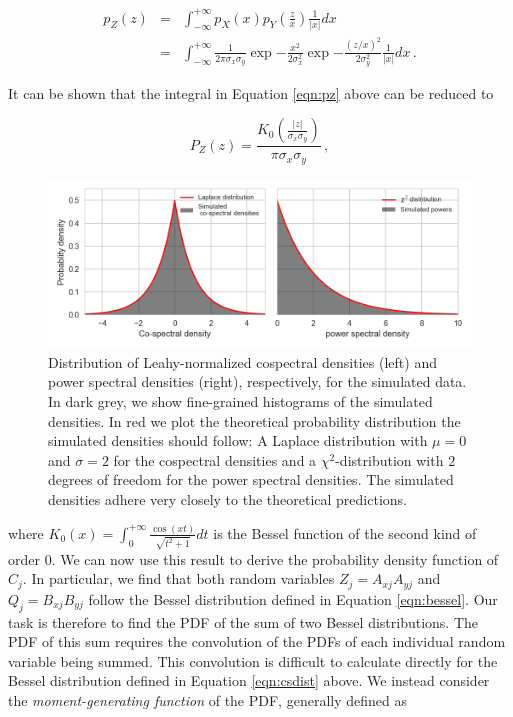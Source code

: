 \documentclass[12pt]{emulateapj}
\begin{document}
\begin{eqnarray}
p_Z(z) & = & \int_{-\infty}^{+\infty}{p_X(x) p_Y(\frac{z}{x}) \frac{1}{|x|} dx} \\\nonumber
	   & = &  \int_{-\infty}^{+\infty}{\frac{1}{2 \pi \sigma_x \sigma_y} \exp{-\frac{x^2}{2\sigma_x^2}} \exp{-\frac{(z/x)^2}{2\sigma_y^2}} \frac{1}{|x|} dx} \label{eqn:pz} \, .
\end{eqnarray}

\noindent It can be shown \citep{watson1922,wishart1932} that the integral in Equation \ref{eqn:pz} above can be reduced to

\begin{equation}
\label{eqn:bessel}
P_Z(z) = \frac{K_0\left( \frac{|z|}{\sigma_x \sigma_y}\right)}{\pi \sigma_x \sigma_y} \, ,
\end{equation}

\begin{figure}
\begin{center}
\includegraphics[width=\textwidth]{cs_dist.png}
\caption{Distribution of Leahy-normalized cospectral densities (left) and power spectral densities (right), respectively, for the simulated data. In dark grey, we show fine-grained histograms of the simulated densities. In red we plot the theoretical probability distribution the simulated densities should follow: A Laplace distribution with $\mu=0$ and $\sigma=2$ for the cospectral densities and a $\chi^2$-distribution with $2$ degrees of freedom for the power spectral densities. The simulated densities adhere very closely to the theoretical predictions.}
\label{fig:csdist}
\end{center}
\end{figure}

\noindent where $K_0(x) = \int_{0}^{+\infty}{\frac{\cos{(xt)}}{\sqrt{t^2 + 1}} dt}$ is the Bessel function of the second kind of order $0$. We can now use this result to derive the probability density function of $C_j$. In particular, we find that both random variables $Z_j = A_{xj} A_{yj}$ and $Q_j = B_{xj} B_{yj}$ follow the Bessel distribution defined in Equation \ref{eqn:bessel}. Our task is therefore to find the PDF of the sum of two Bessel distributions. The PDF of this sum requires the convolution of the PDFs of each individual random variable being summed. This convolution is difficult to calculate directly for the Bessel distribution defined in Equation \ref{eqn:csdist} above. We instead consider the \textit{moment-generating function} of the PDF, generally defined as 
\end{document}
